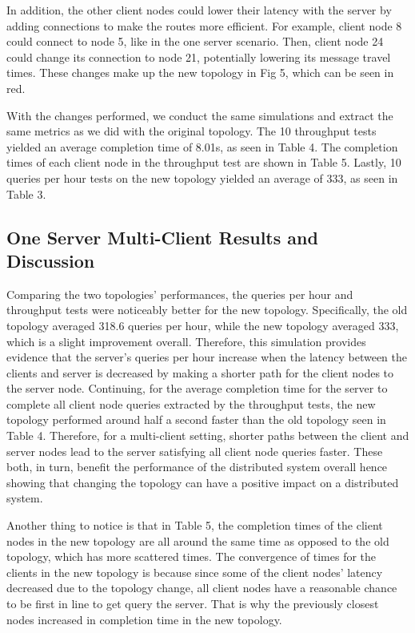 	In addition, the other client nodes could lower their latency with the server by adding connections to make the routes more efficient. For example, client node 8 could connect to node 5, like in the one server scenario. Then, client node 24 could change its connection to node 21, potentially lowering its message travel times. These changes make up the new topology in Fig 5, which can be seen in red.

	With the changes performed, we conduct the same simulations and extract the same metrics as we did with the original topology. The 10 throughput tests yielded an average completion time of 8.01s, as seen in Table 4. The completion times of each client node in the throughput test are shown in Table 5. Lastly, 10 queries per hour tests on the new topology yielded an average of 333, as seen in Table 3.



\subsection{One Server Multi-Client Results and Discussion}

	Comparing the two topologies' performances, the queries per hour and throughput tests were noticeably better for the new topology. Specifically, the old topology averaged 318.6 queries per hour, while the new topology averaged 333, which is a slight improvement overall. Therefore, this simulation provides evidence that the server's queries per hour increase when the latency between the clients and server is decreased by making a shorter path for the client nodes to the server node. Continuing, for the average completion time for the server to complete all client node queries extracted by the throughput tests, the new topology performed around half a second faster than the old topology seen in Table 4. Therefore, for a multi-client setting, shorter paths between the client and server nodes lead to the server satisfying all client node queries faster. These both, in turn, benefit the performance of the distributed system overall hence showing that changing the topology can have a positive impact on a distributed system.

Another thing to notice is that in Table 5, the completion times of the client nodes in the new topology are all around the same time as opposed to the old topology, which has more scattered times. The convergence of times for the clients in the new topology is because since some of the client nodes' latency decreased due to the topology change, all client nodes have a reasonable chance to be first in line to get query the server. That is why the previously closest nodes increased in completion time in the new topology.


